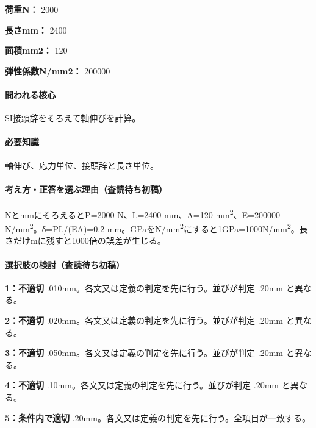 \noindent\textbf{荷重N：} 2000\par

\noindent\textbf{長さmm：} 2400\par

\noindent\textbf{面積mm2：} 120\par

\noindent\textbf{弾性係数N/mm2：} 200000\par

\paragraph{問われる核心} SI接頭辞をそろえて軸伸びを計算。

\paragraph{必要知識} 軸伸び、応力単位、接頭辞と長さ単位。

\paragraph{考え方・正答を選ぶ理由（査読待ち初稿）} NとmmにそろえるとP=\allowbreak{}2000 N、L=\allowbreak{}2400 mm、A=\allowbreak{}120 mm\textsuperscript{2}、E=\allowbreak{}200000 N/mm\textsuperscript{2}。δ=PL/(EA)=\allowbreak{}0.2 mm。GPaをN/mm\textsuperscript{2}にすると1GPa=\allowbreak{}1000N/mm\textsuperscript{2}。長さだけmに残すと1000倍の誤差が生じる。

\paragraph{選択肢の検討（査読待ち初稿）}\mbox{}\par

\noindent\textbf{1：不適切} .010mm。各文又は定義の判定を先に行う。並びが判定 .20mm と異なる。\par

\noindent\textbf{2：不適切} .020mm。各文又は定義の判定を先に行う。並びが判定 .20mm と異なる。\par

\noindent\textbf{3：不適切} .050mm。各文又は定義の判定を先に行う。並びが判定 .20mm と異なる。\par

\noindent\textbf{4：不適切} .10mm。各文又は定義の判定を先に行う。並びが判定 .20mm と異なる。\par

\noindent\textbf{5：条件内で適切} .20mm。各文又は定義の判定を先に行う。全項目が一致する。\par


